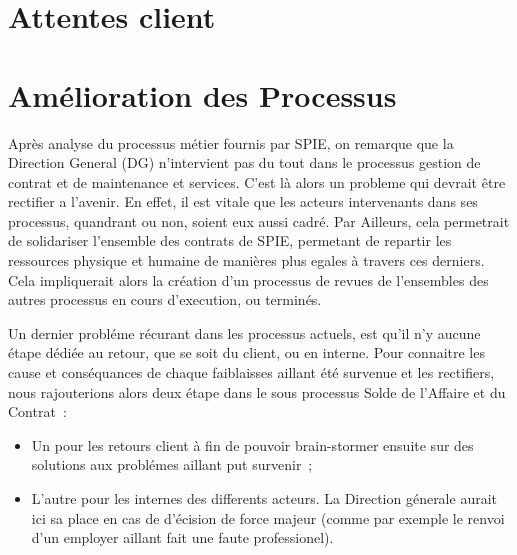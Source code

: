 \chapter{Attentes client}

\chapter{Am\'elioration des Processus}

Apr\`es analyse du processus m\'etier fournis par SPIE, on remarque que la Direction General (DG) n'intervient
pas du tout dans le processus gestion de contrat et de maintenance et services. C'est l\`a alors un probleme
qui devrait \^etre rectifier a l'avenir. En effet, il est vitale que les acteurs intervenants dans ses processus,
quandrant ou non, soient eux aussi cadr\'e. Par Ailleurs, cela permetrait de solidariser l'ensemble des contrats de SPIE, permetant de repartir les ressources
physique et humaine de mani\`eres plus egales \`a travers ces derniers. Cela impliquerait alors la cr\'eation d'un processus
de revues de l'ensembles des autres processus en cours d'execution, ou termin\'es.

Un dernier probl\'eme r\'ecurant dans les processus actuels, est qu'il n'y aucune \'etape d\'edi\'ee au retour, que
se soit du client, ou en interne. Pour connaitre les cause et cons\'equances de chaque faiblaisses aillant \'et\'e survenue
et les rectifiers, nous rajouterions alors deux \'etape dans le sous processus Solde de l'Affaire et du Contrat~:

\begin{itemize}
    \item Un pour les retours client \`a fin de pouvoir brain-stormer ensuite sur des solutions aux probl\'emes aillant
    put survenir~;
    \item L'autre pour les internes des differents acteurs. La Direction g\'enerale aurait ici sa place en cas
    de d'\'ecision de force majeur (comme par exemple le renvoi d'un employer aillant fait une faute professionel).
\end{itemize}
